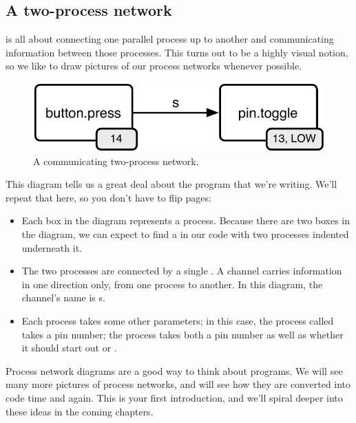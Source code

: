 \subsection{A two-process network}
\plumbing is all about connecting one parallel process up to another and communicating information between those processes. This turns out to be a highly visual notion, so we like to draw pictures of our process networks whenever possible.
 
\begin{figure}[h]
  \begin{center}
    \includegraphics[width=0.8\linewidth]{images/ch4-button-toggle-led}
    \caption{A communicating two-process network.}
    \label{diagram:ch4-button-toggle-led}
  \end{center}
\end{figure}

This diagram tells us a great deal about the \plumbing program that we're writing. We'll repeat that here, so you don't have to flip pages:



\begin{itemize}
	\item Each box in the diagram represents a process. Because there are two boxes in the diagram, we can expect to find a \PAR in our code with two processes indented underneath it. 
	\item The two processes are connected by a single \CHANnel. A channel carries information in one direction only, from one process to another. In this diagram, the channel's name is {\code s}.
	\item Each process takes some other parameters; in this case, the process called \bp takes a pin number; the process \tp takes both a pin number as well as whether it should start out \LOW or \HIGH.
\end{itemize}

Process network diagrams are a good way to think about \plumbing programs. We will see many more pictures of process networks, and will see how they are converted into code time and again. This is your first introduction, and we'll spiral deeper into these ideas in the coming chapters.

